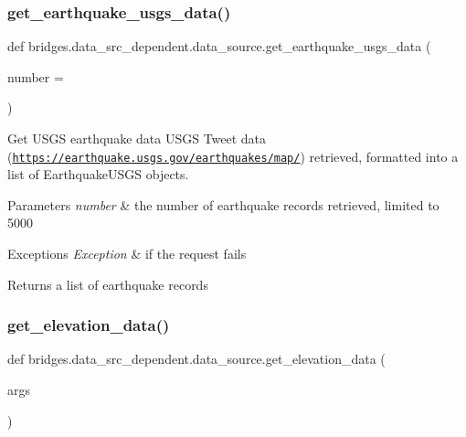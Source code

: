 \subsubsection{\texorpdfstring{get\+\_\+earthquake\+\_\+usgs\+\_\+data()}{get\_earthquake\_usgs\_data()}}
{\footnotesize\ttfamily def bridges.\+data\+\_\+src\+\_\+dependent.\+data\+\_\+source.\+get\+\_\+earthquake\+\_\+usgs\+\_\+data (\begin{DoxyParamCaption}\item[{}]{number = {} }\end{DoxyParamCaption})}



Get U\+S\+GS earthquake data U\+S\+GS Tweet data (\href{https://earthquake.usgs.gov/earthquakes/map/}{\tt https\+://earthquake.\+usgs.\+gov/earthquakes/map/}) retrieved, formatted into a list of Earthquake\+U\+S\+GS objects. 


\begin{DoxyParams}{Parameters}
{\em number} & the number of earthquake records retrieved, limited to 5000 \\
\hline
\end{DoxyParams}

\begin{DoxyExceptions}{Exceptions}
{\em Exception} & if the request fails\\
\hline
\end{DoxyExceptions}
\begin{DoxyReturn}{Returns}
a list of earthquake records 
\end{DoxyReturn}
\mbox{\label{namespacebridges_1_1data__src__dependent_1_1data__source_a5193a0d8e1507b1cedb5de65f1d702bd}} 
\subsubsection{\texorpdfstring{get\+\_\+elevation\+\_\+data()}{get\_elevation\_data()}}
{\footnotesize\ttfamily def bridges.\+data\+\_\+src\+\_\+dependent.\+data\+\_\+source.\+get\+\_\+elevation\+\_\+data (\begin{DoxyParamCaption}\item[{}]{args }\end{DoxyParamCaption})}

